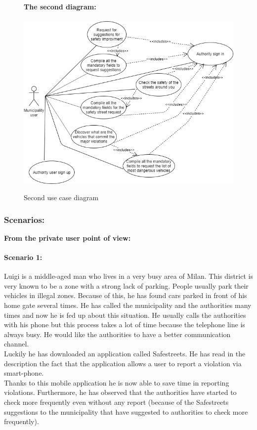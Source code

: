 \documentclass[titlepage]{article}
\begin{document}
\begin{figure}[h]
	\textbf{The second diagram:\\ \\ }
	\includegraphics[scale=0.65]{use case diagrams/use-case2.png}
	\centering
	\caption{Second use case diagram}
\end{figure}
\FloatBarrier

\subsubsection{Scenarios:}
\begin{center}
\textbf{From the private user point of view:}
\end{center}

\paragraph{Scenario 1:}Luigi is a middle-aged man who lives in a very busy area of Milan. This district is very known to be a zone with a strong lack of parking. People usually park their vehicles in illegal zones.
Because of this, he has found  cars parked in front of his home gate several times. He has called the municipality and the authorities many times and now he is fed up about this situation. He usually calls the authorities with his phone but this process takes a lot of time because the telephone line is always busy. He would like the authorities to have a better communication channel.\\Luckily he has downloaded an application called Safestreets. He has read in the description the fact that the application allows a user to report a violation via smart-phone.\\
Thanks to this mobile application he is now able to save time in reporting violations. Furthermore, he has observed that  the authorities have started to check more frequently even without any report (because of the Safestreets suggestions to the municipality that have suggested to authorities to check more frequently).
\end{document}
